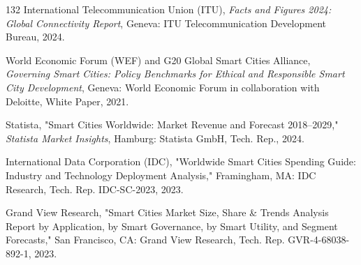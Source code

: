 \documentclass[pdflatex,sn-mathphys-num]{sn-jnl}%
\theoremstyle{thmstyleone}%
\theoremstyle{thmstyletwo}%
\theoremstyle{thmstylethree}%
\begin{document}
\begin{thebibliography}{132}
 International Telecommunication Union (ITU), \emph{Facts and Figures 2024: Global Connectivity Report}, Geneva: ITU Telecommunication Development Bureau, 2024.

 World Economic Forum (WEF) and G20 Global Smart Cities Alliance, \emph{Governing Smart Cities: Policy Benchmarks for Ethical and Responsible Smart City Development}, Geneva: World Economic Forum in collaboration with Deloitte, White Paper, 2021.

 Statista, "Smart Cities Worldwide: Market Revenue and Forecast 2018--2029," \emph{Statista Market Insights}, Hamburg: Statista GmbH, Tech. Rep., 2024.

 International Data Corporation (IDC), "Worldwide Smart Cities Spending Guide: Industry and Technology Deployment Analysis," Framingham, MA: IDC Research, Tech. Rep. IDC-SC-2023, 2023.

 Grand View Research, "Smart Cities Market Size, Share \& Trends Analysis Report by Application, by Smart Governance, by Smart Utility, and Segment Forecasts," San Francisco, CA: Grand View Research, Tech. Rep. GVR-4-68038-892-1, 2023.

\end{thebibliography}
\end{document}
